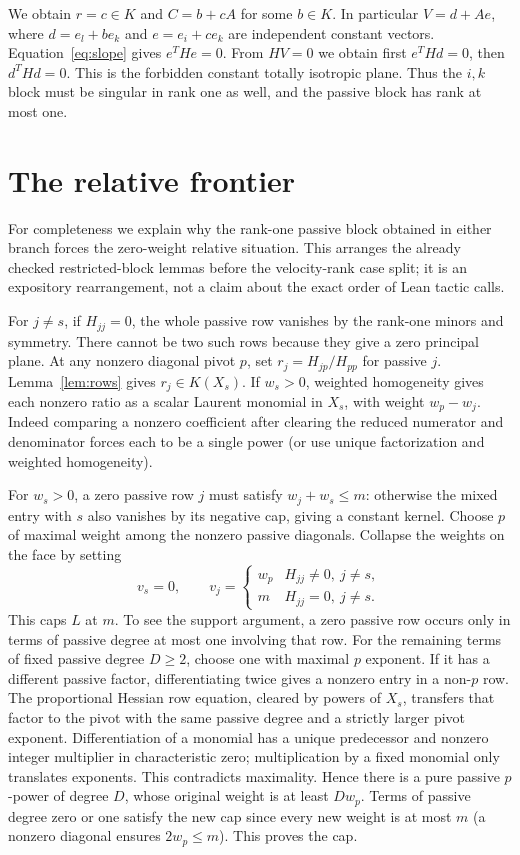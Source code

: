 \documentclass[11pt,a4paper]{article}
\begin{document}
We obtain $r=c\in K$ and $C=b+cA$ for some $b\in K$. In particular $V=d+Ae$, where $d=e_l+b e_k$ and $e=e_i+c e_k$ are independent constant vectors. Equation~\eqref{eq:slope} gives $e^THe=0$. From $HV=0$ we obtain first $e^THd=0$, then $d^THd=0$. This is the forbidden constant totally isotropic plane. Thus the $i,k$ block must be singular in rank one as well, and the passive block has rank at most one.

\section{The relative frontier}
For completeness we explain why the rank-one passive block obtained in either branch forces the zero-weight relative situation. This arranges the already checked restricted-block lemmas before the velocity-rank case split; it is an expository rearrangement, not a claim about the exact order of Lean tactic calls.

For $j\ne s$, if $H_{jj}=0$, the whole passive row vanishes by the rank-one minors and symmetry. There cannot be two such rows because they give a zero principal plane. At any nonzero diagonal pivot $p$, set $r_j=H_{jp}/H_{pp}$ for passive $j$. Lemma~\ref{lem:rows} gives $r_j\in K(X_s)$. If $w_s>0$, weighted homogeneity gives each nonzero ratio as a scalar Laurent monomial in $X_s$, with weight $w_p-w_j$. Indeed comparing a nonzero coefficient after clearing the reduced numerator and denominator forces each to be a single power (or use unique factorization and weighted homogeneity).

For $w_s>0$, a zero passive row $j$ must satisfy $w_j+w_s\le m$: otherwise the mixed entry with $s$ also vanishes by its negative cap, giving a constant kernel. Choose $p$ of maximal weight among the nonzero passive diagonals. Collapse the weights on the face by setting
\[
 v_s=0,\qquad
 v_j=\begin{cases}
 w_p& H_{jj}\ne0,\ j\ne s,\\
 m& H_{jj}=0,\ j\ne s .
 \end{cases}
\]
This caps $L$ at $m$. To see the support argument, a zero passive row occurs only in terms of passive degree at most one involving that row. For the remaining terms of fixed passive degree $D\ge2$, choose one with maximal $p$ exponent. If it has a different passive factor, differentiating twice gives a nonzero entry in a non-$p$ row. The proportional Hessian row equation, cleared by powers of $X_s$, transfers that factor to the pivot with the same passive degree and a strictly larger pivot exponent. Differentiation of a monomial has a unique predecessor and nonzero integer multiplier in characteristic zero; multiplication by a fixed monomial only translates exponents. This contradicts maximality. Hence there is a pure passive $p$-power of degree $D$, whose original weight is at least $Dw_p$. Terms of passive degree zero or one satisfy the new cap since every new weight is at most $m$ (a nonzero diagonal ensures $2w_p\le m$). This proves the cap.
\end{document}
